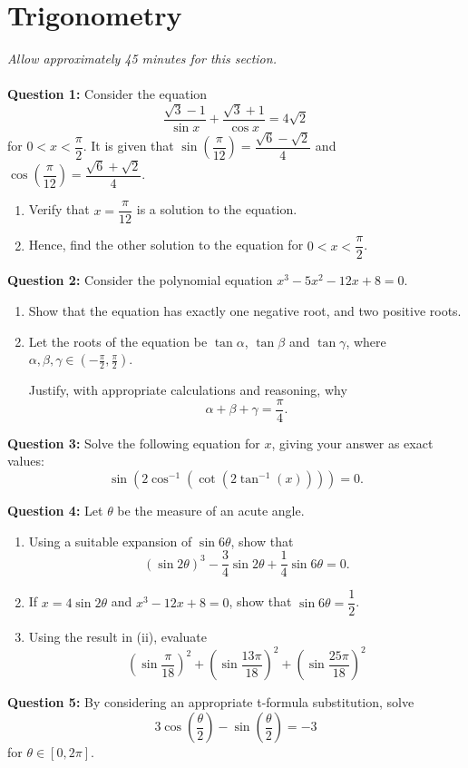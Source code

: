 \documentclass[oneside]{article}[14pt]
\begin{document}
\section{Trigonometry}
\textit{Allow approximately 45 minutes for this section.} \\
\HRule \\
\vskip 4pt
\textbf{Question 1:}
Consider the equation $$\dfrac{\sqrt{3}-1}{\sin x}+\dfrac{\sqrt{3}+1}{\cos x}=4\sqrt 2$$ for $0<x<\dfrac{\pi}{2}$. It is given that $\sin\left(\dfrac{\pi}{12}\right)=\dfrac{\sqrt{6}-\sqrt{2}}{4}$ and $\cos\left(\dfrac{\pi}{12}\right)=\dfrac{\sqrt{6}+\sqrt{2}}{4}$.
\begin{enumerate}
	\item[(i)] Verify that $x=\dfrac{\pi}{12}$ is a solution to the equation. \hfill {}
	\item[(ii)] Hence, find the other solution to the equation for $0<x<\dfrac{\pi}{2}$. \hfill {}
\end{enumerate}
\vskip 8pt

\textbf{Question 2:}
Consider the polynomial equation $x^3-5x^2-12x+8=0$.
\begin{enumerate}
	\item[(i)] Show that the equation has exactly one negative root, and two positive roots. \hfill {}
	\item[(ii)] Let the roots of the equation be $\tan\alpha$, $\tan\beta$ and $\tan\gamma$, where $\alpha,\beta,\gamma \in \left(-\frac{\pi}{2},\frac{\pi}{2}\right)$.

	      Justify, with appropriate calculations and reasoning, why\[\alpha + \beta + \gamma = \frac{\pi}{4}.\] \hfill {}
\end{enumerate}
\vskip 8pt

\textbf{Question 3:}
Solve the following equation for $x$, giving your answer as exact values: \[ \sin\left(2\cos^{-1}\left(\cot\left(2\tan^{-1}(x)\right)\right)\right)=0.\] \hfill {}
\vskip 8pt

\textbf{Question 4:}
Let $\theta$ be the measure of an acute angle.
\begin{enumerate}
	\item[(i)] Using a suitable expansion of $\sin 6\theta$, show that \[(\sin 2\theta)^3-\dfrac{3}{4}\sin 2\theta + \dfrac{1}{4}\sin 6\theta = 0.\] \hfill {}
	\item[(ii)] If $x=4\sin 2\theta$ and $x^3-12x+8=0$, show that $\sin 6\theta = \dfrac{1}{2}$. \hfill {}
	\item[(iii)] Using the result in (ii), evaluate \[\left(\sin\dfrac{\pi}{18}\right)^2+\left(\sin\dfrac{13\pi}{18}\right)^2+\left(\sin\dfrac{25\pi}{18}\right)^2\] \hfill {}
\end{enumerate}
\vskip 8pt

\textbf{Question 5:}
By considering an appropriate t-formula substitution, solve \[3\cos\left(\dfrac{\theta}{2}\right)-\sin\left(\dfrac{\theta}{2}\right)=-3\] for $\theta \in [0,2\pi]$. \hfill {}
\end{document}
